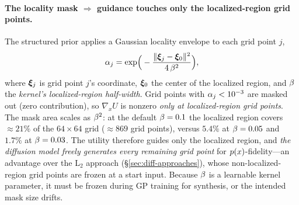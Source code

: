 \paragraph{The locality mask $\Rightarrow$ guidance touches only the
localized-region grid points.}
The structured prior applies a Gaussian locality envelope to each grid point $j$,
\begin{equation}
\alpha_{j}=\exp\!\Big(-\frac{\lVert\bm{\xi}_{j}-\bm{\xi}_{0}\rVert^{2}}{4\,\beta^{2}}\Big),
\label{eq:rfmask}
\end{equation}
where $\bm{\xi}_{j}$ is grid point $j$'s coordinate, $\bm{\xi}_{0}$ the center of the
localized region, and $\beta$ the \emph{kernel's localized-region half-width}.
Grid points with $\alpha_{j}<10^{-3}$ are masked out (zero contribution), so
$\nabla_{x}U$ is nonzero \emph{only at localized-region grid points}. The mask area
scales as $\beta^{2}$: at the default $\beta=0.1$ the localized region covers
$\approx21\%$ of the $64\times64$ grid ($\approx869$ grid points), versus $5.4\%$
at $\beta=0.05$ and $1.7\%$ at $\beta=0.03$. The utility therefore guides only the
localized region, and \emph{the diffusion model freely generates every remaining
grid point} for $p(x)$-fidelity---an advantage over the L$_{2}$ approach
(\S\ref{sec:diff-approaches}), whose non-localized-region grid points are frozen at
a start input. Because $\beta$ is a learnable kernel parameter, it must be frozen
during GP training for synthesis, or the intended mask size drifts.


